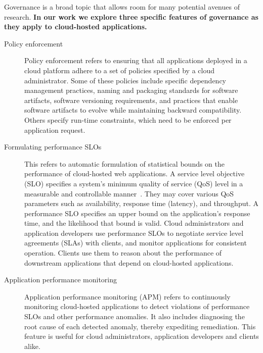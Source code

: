 Governance is a broad topic that allows room for many potential avenues of research.
\textbf{In our work we explore three specific features of governance as they apply to cloud-hosted applications.}
\begin{description}
\item [Policy enforcement]
Policy enforcement refers to ensuring that all applications deployed in a cloud platform
adhere to a set of policies specified by a cloud administrator.
Some of these policies include specific
dependency management practices, naming and packaging standards for software artifacts, 
software versioning requirements, and practices that enable software artifacts to evolve 
while maintaining backward compatibility.
Others specify run-time constraints, which need to be enforced per application request.

\item [Formulating performance SLOs]
This refers to automatic formulation of statistical bounds on the 
performance of cloud-hosted web applications.
A service level objective (SLO) specifies a system's minimum quality of service (QoS) level in a measurable and
controllable manner~\cite{smj2000}. They may cover various QoS
parameters such as availability, response time (latency), and throughput. A performance SLO
specifies an upper bound on the application's response time, and the likelihood that bound is valid.
Cloud administrators and application developers use performance SLOs to negotiate service level agreements (SLAs)
with clients, and monitor applications for consistent operation. Clients use them to reason about
the performance of downstream applications that depend on cloud-hosted applications.

\item [Application performance monitoring]
Application performance monitoring (APM) refers to continuously monitoring cloud-hosted applications
to detect violations of performance SLOs and other performance anomalies. 
It also includes diagnosing the root cause of each detected anomaly, thereby expediting
remediation. This feature is useful for cloud administrators, application developers and clients
alike.
\end{description}

